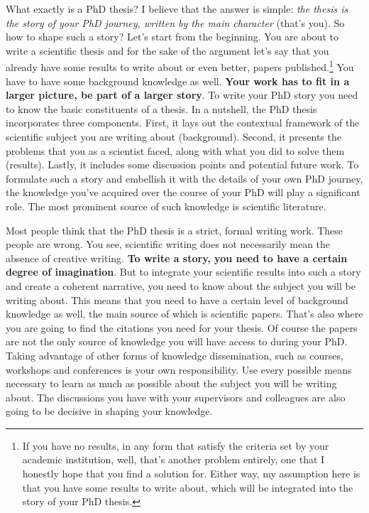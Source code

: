 \documentclass[
  12pt,
]{book}
\begin{document}
What exactly is a PhD thesis?
I believe that the answer is simple: \emph{the thesis is the story of your PhD journey, written by the main character} (that's you).
So how to shape such a story?
Let's start from the beginning.
You are about to write a scientific thesis and for the sake of the argument let's say that you already have some results to write about or even better, papers published.\footnote{If you have no results, in any form that satisfy the criteria set by your academic institution, well, that's another problem entirely, one that I honestly hope that you find a solution for. Either way, my assumption here is that you have some results to write about, which will be integrated into the story of your PhD thesis.}
You have to have some background knowledge as well.
\textbf{Your work has to fit in a larger picture, be part of a larger story}.
To write your PhD story you need to know the basic constituents of a thesis.
In a nutshell, the PhD thesis incorporates three components.
First, it lays out the contextual framework of the scientific subject you are writing about (background).
Second, it presents the problems that you as a scientist faced, along with what you did to solve them (results).
Lastly, it includes some discussion points and potential future work.
To formulate such a story and embellish it with the details of your own PhD journey, the knowledge you've acquired over the course of your PhD will play a significant role.
The most prominent source of such knowledge is scientific literature.

Most people think that the PhD thesis is a strict, formal writing work.
These people are wrong.
You see, scientific writing does not necessarily mean the absence of creative writing.
\textbf{To write a story, you need to have a certain degree of imagination}.
But to integrate your scientific results into such a story and create a coherent narrative, you need to know about the subject you will be writing about.
This means that you need to have a certain level of background knowledge as well, the main source of which is scientific papers.
That's also where you are going to find the citations you need for your thesis.
Of course the papers are not the only source of knowledge you will have access to during your PhD.
Taking advantage of other forms of knowledge dissemination, such as courses, workshops and conferences is your own responsibility.
Use every possible means necessary to learn as much as possible about the subject you will be writing about.
The discussions you have with your supervisors and colleagues are also going to be decisive in shaping your knowledge.
\end{document}
